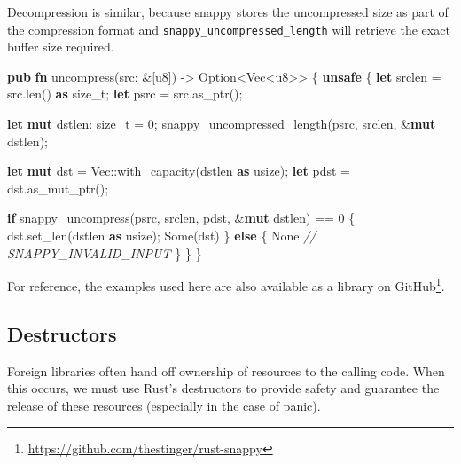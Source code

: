 \documentclass[a4paper,]{book}
\newenvironment{Shaded}{\begin{snugshade}}{\end{snugshade}}
\newcommand{\KeywordTok}[1]{\textcolor[rgb]{0.13,0.29,0.53}{\textbf{{#1}}}}
\newcommand{\DataTypeTok}[1]{\textcolor[rgb]{0.13,0.29,0.53}{{#1}}}
\newcommand{\DecValTok}[1]{\textcolor[rgb]{0.00,0.00,0.81}{{#1}}}
\newcommand{\ConstantTok}[1]{\textcolor[rgb]{0.00,0.00,0.00}{{#1}}}
\newcommand{\CommentTok}[1]{\textcolor[rgb]{0.56,0.35,0.01}{\textit{{#1}}}}
\newcommand{\NormalTok}[1]{{#1}}
\renewcommand{\href}[2]{#2\footnote{\url{#1}}}
\begin{document}
Decompression is similar, because snappy stores the uncompressed size as
part of the compression format and \texttt{snappy\_uncompressed\_length}
will retrieve the exact buffer size required.

\begin{Shaded}
\begin{Highlighting}[]
\KeywordTok{pub} \KeywordTok{fn} \NormalTok{uncompress(src: &[}\DataTypeTok{u8}\NormalTok{]) -> }\DataTypeTok{Option}\NormalTok{<}\DataTypeTok{Vec}\NormalTok{<}\DataTypeTok{u8}\NormalTok{>> \{}
    \KeywordTok{unsafe} \NormalTok{\{}
        \KeywordTok{let} \NormalTok{srclen = src.len() }\KeywordTok{as} \DataTypeTok{size_t}\NormalTok{;}
        \KeywordTok{let} \NormalTok{psrc = src.as_ptr();}

        \KeywordTok{let} \KeywordTok{mut} \NormalTok{dstlen: }\DataTypeTok{size_t} \NormalTok{= }\DecValTok{0}\NormalTok{;}
        \NormalTok{snappy_uncompressed_length(psrc, srclen, &}\KeywordTok{mut} \NormalTok{dstlen);}

        \KeywordTok{let} \KeywordTok{mut} \NormalTok{dst = }\DataTypeTok{Vec}\NormalTok{::with_capacity(dstlen }\KeywordTok{as} \DataTypeTok{usize}\NormalTok{);}
        \KeywordTok{let} \NormalTok{pdst = dst.as_mut_ptr();}

        \KeywordTok{if} \NormalTok{snappy_uncompress(psrc, srclen, pdst, &}\KeywordTok{mut} \NormalTok{dstlen) == }\DecValTok{0} \NormalTok{\{}
            \NormalTok{dst.set_len(dstlen }\KeywordTok{as} \DataTypeTok{usize}\NormalTok{);}
            \ConstantTok{Some}\NormalTok{(dst)}
        \NormalTok{\} }\KeywordTok{else} \NormalTok{\{}
            \ConstantTok{None} \CommentTok{// SNAPPY_INVALID_INPUT}
        \NormalTok{\}}
    \NormalTok{\}}
\NormalTok{\}}
\end{Highlighting}
\end{Shaded}

For reference, the examples used here are also available as a
\href{https://github.com/thestinger/rust-snappy}{library on GitHub}.

\subsection{Destructors}\label{destructors}

Foreign libraries often hand off ownership of resources to the calling
code. When this occurs, we must use Rust's destructors to provide safety
and guarantee the release of these resources (especially in the case of
panic).
\end{document}
